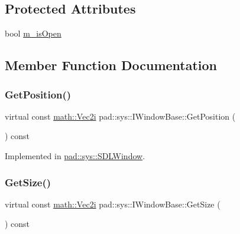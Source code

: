 \subsection*{Protected Attributes}
\begin{DoxyCompactItemize}
\item 
bool \mbox{\hyperlink{classpad_1_1sys_1_1_i_window_base_a4ca3e1915cb3c100497ace0d7d04fa23}{m\+\_\+is\+Open}}
\end{DoxyCompactItemize}


\subsection{Member Function Documentation}
\mbox{\label{classpad_1_1sys_1_1_i_window_base_ac3cb42c492b8c2ba59f36da4702b7bec}} 
\subsubsection{\texorpdfstring{Get\+Position()}{GetPosition()}}
{\footnotesize\ttfamily virtual const \mbox{\hyperlink{namespacepad_1_1math_a808a631a6bccd994f9589d7fb86bad41}{math\+::\+Vec2i}} pad\+::sys\+::\+I\+Window\+Base\+::\+Get\+Position (\begin{DoxyParamCaption}{ }\end{DoxyParamCaption}) const\hspace{0.3cm}{\ttfamily [pure virtual]}}



Implemented in \mbox{\hyperlink{classpad_1_1sys_1_1_s_d_l_window_a43391052519ec0bc8c194642d6d68d12}{pad\+::sys\+::\+S\+D\+L\+Window}}.

\mbox{\label{classpad_1_1sys_1_1_i_window_base_acf3540e89da05cc490cf981f196ad771}} 
\subsubsection{\texorpdfstring{Get\+Size()}{GetSize()}}
{\footnotesize\ttfamily virtual const \mbox{\hyperlink{namespacepad_1_1math_a808a631a6bccd994f9589d7fb86bad41}{math\+::\+Vec2i}} pad\+::sys\+::\+I\+Window\+Base\+::\+Get\+Size (\begin{DoxyParamCaption}{ }\end{DoxyParamCaption}) const\hspace{0.3cm}{\ttfamily [pure virtual]}}



